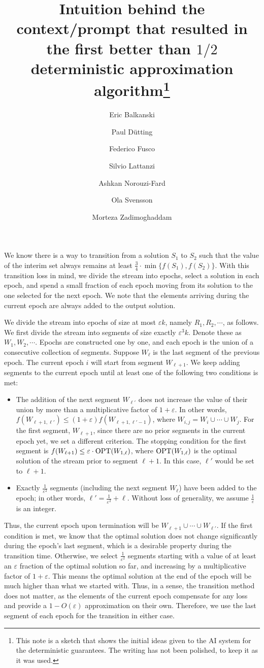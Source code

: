 \documentclass[11pt]{article}
\title{Intuition behind the context/prompt that resulted in the first better than $1/2$ deterministic approximation algorithm\thanks{This note is a sketch that shows the initial ideas given to the AI system for the deterministic guarantees. The writing has not been polished, to keep it as it was used.}}
\author{Eric Balkanski \and Paul D\"utting \and Federico Fusco \and Silvio Lattanzi \and Ashkan Norouzi-Fard \and Ola Svensson \and Morteza Zadimoghaddam}
\date{}
\newcommand{\OPT}{\textnormal{OPT}}
\newcommand{\eps}{\varepsilon}
\begin{document}
\maketitle

We know there is a way to transition from a solution $S_1$ to $S_2$ such that the value of the interim set always remains at least $\frac{3}{4} \cdot \min\{f(S_1), f(S_2)\}$.
With this transition loss in mind, we divide the stream into epochs, select a solution in each epoch, and spend a small fraction of each epoch moving from its solution to the one selected for the next epoch. We note that the elements arriving during the current epoch are always added to the output solution.

We divide the stream into epochs of size at most $\eps k$, namely $R_1, R_2, \cdots$, as follows. We first divide the stream into segments of size exactly $\eps^3 k$. Denote these as $W_1, W_2, \cdots$. Epochs are constructed one by one, and each epoch is the union of a consecutive collection of segments.
Suppose $W_{\ell}$ is the last segment of the previous epoch. The current epoch $i$ will start from segment $W_{\ell+1}$. We keep adding segments to the current epoch until at least one of the following two conditions is met:
\begin{itemize}
    \item The addition of the next segment $W_{\ell'}$ does not increase the value of their union by more than a multiplicative factor of $1 + \eps$. In other words, $f(W_{\ell+1, \ell'}) \le (1+\eps) f(W_{\ell+1, \ell'-1})$, where $W_{i,j} = W_i \cup \cdots \cup W_j$. For the first segment, $W_{\ell+1}$, since there are no prior segments in the current epoch yet, we set a different criterion. The stopping condition for the first segment is $f(W_{\ell+1}) \le \eps \cdot \OPT(W_{1,\ell})$, where $\OPT(W_{1, \ell})$ is the optimal solution of the stream prior to segment $\ell+1$. In this case, $\ell'$ would be set to $\ell+1$.
    \item Exactly $\frac{1}{\eps^2}$ segments (including the next segment $W_{\ell}$) have been added to the epoch; in other words, $\ell' = \frac{1}{\eps^2} + \ell$. Without loss of generality, we assume $\frac{1}{\eps}$ is an integer.
\end{itemize}

Thus, the current epoch upon termination will be $W_{\ell+1} \cup \cdots \cup W_{\ell'}$.
If the first condition is met, we know that the optimal solution does not change significantly during the epoch's last segment, which is a desirable property during the transition time.
Otherwise, we select $\frac{1}{\eps^2}$ segments starting with a value of at least an $\eps$ fraction of the optimal solution so far, and increasing by a multiplicative factor of $1+\eps$. This means the optimal solution at the end of the epoch will be much higher than what we started with. Thus, in a sense, the transition method does not matter, as the elements of the current epoch compensate for any loss and provide a $1-O(\eps)$ approximation on their own. Therefore, we use the last segment of each epoch for the transition in either case.
\end{document}
